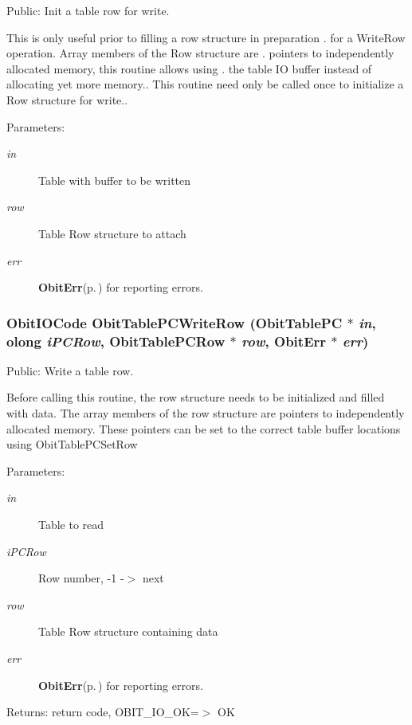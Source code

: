 Public: Init a table row for write. 

This is only useful prior to filling a row structure in preparation . for a Write\-Row operation. Array members of the Row structure are . pointers to independently allocated memory, this routine allows using . the table IO buffer instead of allocating yet more memory.. This routine need only be called once to initialize a Row structure for write.. \begin{Desc}
\item[Parameters:]
\begin{description}
\item[{\em in}]Table with buffer to be written \item[{\em row}]Table Row structure to attach \item[{\em err}]{\bf Obit\-Err}{\rm (p.\,\pageref{structObitErr})} for reporting errors. \end{description}
\end{Desc}
\subsubsection{\setlength{\rightskip}{0pt plus 5cm}Obit\-IOCode Obit\-Table\-PCWrite\-Row ({\bf Obit\-Table\-PC} $\ast$ {\em in}, {\bf olong} {\em i\-PCRow}, {\bf Obit\-Table\-PCRow} $\ast$ {\em row}, {\bf Obit\-Err} $\ast$ {\em err})}\label{ObitTablePC_8h_a20}


Public: Write a table row. 

Before calling this routine, the row structure needs to be initialized and filled with data. The array members of the row structure are pointers to independently allocated memory. These pointers can be set to the correct table buffer locations using Obit\-Table\-PCSet\-Row \begin{Desc}
\item[Parameters:]
\begin{description}
\item[{\em in}]Table to read \item[{\em i\-PCRow}]Row number, -1 -$>$ next \item[{\em row}]Table Row structure containing data \item[{\em err}]{\bf Obit\-Err}{\rm (p.\,\pageref{structObitErr})} for reporting errors. \end{description}
\end{Desc}
\begin{Desc}
\item[Returns:]return code, OBIT\_\-IO\_\-OK=$>$ OK \end{Desc}
